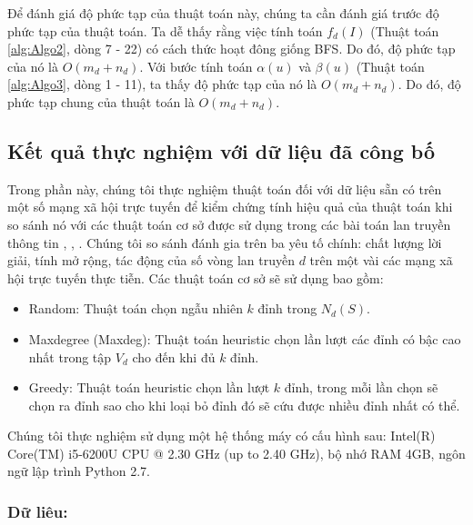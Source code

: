 Để đánh giá độ phức tạp của thuật toán này, chúng ta cần đánh giá trước độ phức tạp của thuật toán. Ta dễ thấy rằng việc tính  toán $f_{d}(I)$ (Thuật toán \ref{alg:Algo2}, dòng 7 - 22) có cách thức hoạt đông giống BFS. Do đó, độ phức tạp của nó là $O(m_{d} + n_{d})$. Với bước tính toán $\alpha(u)$ và $\beta(u)$ (Thuật toán \ref{alg:Algo3}, dòng 1 - 11), ta thấy độ phức tạp của nó là $O(m_{d} + n_{d})$. Do đó, độ phức tạp chung của thuật toán là $O(m_{d} + n_{d})$. 

\subsection{Kết quả thực nghiệm với dữ liệu đã công bố}

Trong phần này, chúng tôi thực nghiệm thuật toán đối với dữ liệu sẵn có trên một số mạng xã hội trực tuyến để kiểm chứng tính hiệu quả của thuật toán khi so sánh nó với các thuật toán cơ sở được sử dụng trong các bài toán lan truyền thông tin \cite{nguyen30}, \cite{kemple1}, \cite{zhang32}. Chúng tôi so sánh đánh gia trên ba yêu tố chính: chất lượng lời giải, tính mở rộng, tác động của số vòng lan truyền $d$ trên một vài các mạng xã hội trực tuyến thực tiễn. Các thuật toán cơ sở sẽ sử dụng bao gồm:
\begin{itemize}
	\item Random: Thuật toán chọn ngẫu nhiên $k$ đỉnh trong $N_{d}(S)$.
	
	\item Maxdegree (Maxdeg): Thuật toán heuristic chọn lần lượt các đỉnh có bậc cao nhất trong tập $V_{d}$ cho đến khi đủ $k$ đỉnh.
	
	\item Greedy: Thuật toán heuristic chọn lần lượt $k$ đỉnh, trong mỗi lần chọn sẽ chọn ra đỉnh sao cho khi loại bỏ đỉnh đó sẽ cứu được nhiều đỉnh nhất có thể.
\end{itemize}

Chúng tôi thực nghiệm sử dụng một hệ thống máy có cấu hình sau: Intel(R) Core(TM) i5-6200U CPU @ 2.30 GHz (up to 2.40 GHz), bộ nhớ RAM 4GB, ngôn ngữ lập trình Python 2.7.

\subsubsection{Dữ liêu:}

